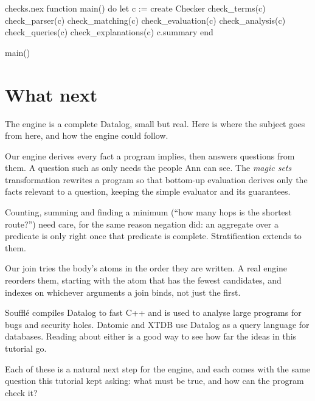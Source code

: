 \begin{continued}{checks.nex}
function main()
do
  let c := create Checker
  check_terms(c)
  check_parser(c)
  check_matching(c)
  check_evaluation(c)
  check_analysis(c)
  check_queries(c)
  check_explanations(c)
  c.summary
end

main()
\end{continued}


\section{What next}

The engine is a complete Datalog, small but real. Here is where the
subject goes from here, and how the engine could follow.

\begin{description}[style=nextline, leftmargin=1.2em, itemsep=0.4em]
  \item[Answering only what is asked.] Our engine derives every fact a
    program implies, then answers questions from them. A question such as
     only needs the people Ann can see. The
    \emph{magic sets} transformation rewrites a program so that bottom-up
    evaluation derives only the facts relevant to a question, keeping the
    simple evaluator and its guarantees.
  \item[Aggregates.] Counting, summing and finding a minimum (``how many
    hops is the shortest route?'') need care, for the same reason negation
    did: an aggregate over a predicate is only right once that predicate is
    complete. Stratification extends to them.
  \item[Better joins.] Our join tries the body's atoms in the order they
    are written. A real engine reorders them, starting with the atom that
    has the fewest candidates, and indexes on whichever arguments a join
    binds, not just the first.
  \item[Datalog in use.] Soufflé compiles Datalog to fast C++ and is used to
    analyse large programs for bugs and security holes. Datomic and XTDB use
    Datalog as a query language for databases. Reading about either is a
    good way to see how far the ideas in this tutorial go.
\end{description}

Each of these is a natural next step for the engine, and each comes with
the same question this tutorial kept asking: what must be true, and how can
the program check it?
